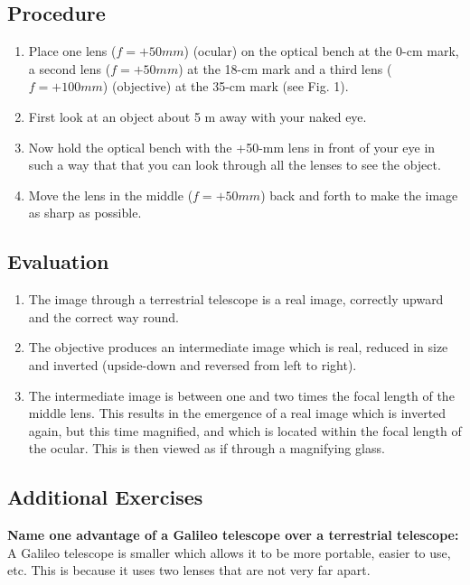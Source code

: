\documentclass[12pt]{article}
\begin{document}
\subsection*{Procedure}
\begin{enumerate}
    \item Place one lens ($f = +50 mm$) (ocular) on the optical bench at the 0-cm mark, a second lens ($f = + 50 mm$) at the 18-cm mark and a third lens ($f = + 100 mm$) (objective) at the 35-cm mark (see Fig. 1). 
    \item First look at an object about 5 m away with your naked eye. 
    \item Now hold the optical bench with the +50-mm lens in front of your eye in such a way that that you can look through all the lenses to see the object. 
    \item Move the lens in the middle ($f = + 50 mm$) back and forth to make the image as sharp as possible. 
\end{enumerate}

\subsection*{Evaluation}
\begin{enumerate}
    \item The image through a terrestrial telescope is a real image, correctly upward and the correct way round. 
    \item The objective produces an intermediate image which is real, reduced in size and inverted (upside-down and reversed from left to right). 
    \item The intermediate image is between one and two times the focal length of the middle lens. This results in the emergence of a real image which is inverted again, but this time magnified, and which is located within the focal length of the ocular. This is then viewed as if through a magnifying glass. 
\end{enumerate}

\subsection*{Additional Exercises}
\textbf{Name one advantage of a Galileo telescope over a terrestrial telescope:}\\
A Galileo telescope is smaller which allows it to be more portable, easier to use, etc. This is because it uses two lenses that are not very far apart.  

\newpage
\end{document}
